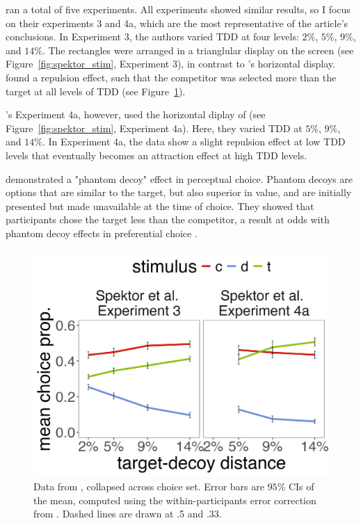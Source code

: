 \textcite{spektorWhenGoodLooks2018b} ran a total of five experiments. All experiments showed similar results, so I focus on their experiments 3 and 4a, which are the most representative of the article's conclusions. In Experiment 3, the authors varied TDD at four levels: $2\%$, $5\%$, $9\%$, and $14\%$. The rectangles were arranged in a trianglular display on the screen (see Figure~\ref{fig:spektor_stim}, Experiment 3), in contrast to \textcite{trueblood2013not}'s horizontal display. \textcite{spektorWhenGoodLooks2018b} found a repulsion effect, such that the competitor was selected more than the target at all levels of TDD (see Figure~\ref{fig:spektor_data}). 

\textcite{spektorWhenGoodLooks2018b}'s Experiment 4a, however, used the horizontal diplay of \textcite{trueblood2013not} (see Figure~\ref{fig:spektor_stim}, Experiment 4a). Here, they varied TDD at $5\%$, $9\%$, and $14\%$. In Experiment 4a, the data show a slight repulsion effect at low TDD levels that eventually becomes an attraction effect at high TDD levels. 

\textcite{truebloodPhantomDecoyEffect2017c} demonstrated a "phantom decoy" effect in perceptual choice. Phantom decoys are options that are similar to the target, but also superior in value, and are initially presented but made unavailable at the time of choice. They showed that participants chose the target less than the competitor, a result at odds with phantom decoy effects in preferential choice \parencite{pratkanisBriefHistoryResearch1992b,pettiboneExaminingModelsNondominated2000}. 

\begin{figure}
   \includegraphics[width=\linewidth]{figures/spektor_data_collapsed.jpeg}
   \caption{Data from \textcite{spektorWhenGoodLooks2018b}, collapsed across choice set. Error bars are $95\%$ CIs of the mean, computed using the within-participants error correction from \textcite{morey2008confidence}. Dashed lines are drawn at .5 and .33.}
   \label{fig:spektor_data} %
\end{figure}

